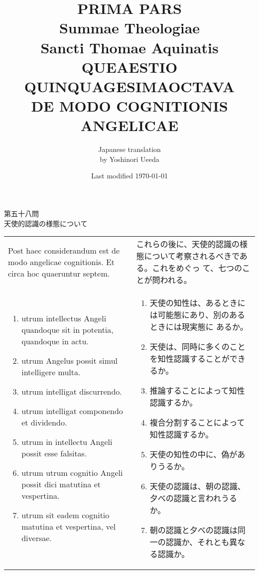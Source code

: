 \documentclass[10pt]{jsarticle} %
\title{{\bf PRIMA PARS}\\{\HUGE Summae Theologiae}\\Sancti Thomae
Aquinatis\\{\sffamily QUEAESTIO QUINQUAGESIMAOCTAVA}\\DE MODO
COGNITIONIS ANGELICAE}
\author{Japanese translation\\by Yoshinori {\sc Ueeda}}
\date{Last modified \today}
\begin{document}
\maketitle
\pagestyle{fancy}

\begin{center}
{\Large 第五十八問\\天使的認識の様態について}
\end{center}

\begin{longtable}{p{21em}p{21em}}
Post haec considerandum est de modo angelicae cognitionis. Et circa
hoc quaeruntur septem.

&

これらの後に、天使的認識の様態について考察されるべきである。これをめぐっ
て、七つのことが問われる。


\\


\begin{enumerate}
 \item utrum intellectus Angeli quandoque sit in potentia, quandoque in actu.
 \item utrum Angelus possit simul intelligere multa.
 \item utrum intelligat discurrendo.
 \item utrum intelligat componendo et dividendo.
 \item utrum in intellectu Angeli possit esse falsitas.
 \item utrum utrum cognitio Angeli possit dici matutina et vespertina.
 \item utrum sit eadem cognitio matutina et vespertina, vel diversae.
\end{enumerate}


 &

 \begin{enumerate}
  \item 天使の知性は、あるときには可能態にあり、別のあるときには現実態に
	あるか。
  \item 天使は、同時に多くのことを知性認識することができるか。
  \item 推論することによって知性認識するか。
  \item 複合分割することによって知性認識するか。
  \item 天使の知性の中に、偽がありうるか。
  \item 天使の認識は、朝の認識、夕べの認識と言われうるか。
  \item 朝の認識と夕べの認識は同一の認識か、それとも異なる認識か。
 \end{enumerate}

\end{longtable}
\end{document}
